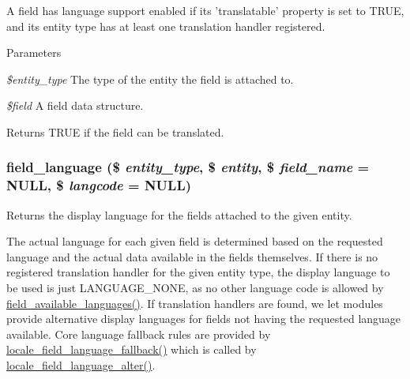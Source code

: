 A field has language support enabled if its 'translatable' property is set to TRUE, and its entity type has at least one translation handler registered.


\begin{DoxyParams}{Parameters}
\item[{\em \$entity\_\-type}]The type of the entity the field is attached to. \item[{\em \$field}]A field data structure.\end{DoxyParams}
\begin{DoxyReturn}{Returns}
TRUE if the field can be translated. 
\end{DoxyReturn}
\hypertarget{group__field__language_gaff79088cd3951d2127adad1a2c13ad3e}{
\subsubsection[{field\_\-language}]{\setlength{\rightskip}{0pt plus 5cm}field\_\-language (\$ {\em entity\_\-type}, \/  \$ {\em entity}, \/  \$ {\em field\_\-name} = {\ttfamily NULL}, \/  \$ {\em langcode} = {\ttfamily NULL})}}
\label{group__field__language_gaff79088cd3951d2127adad1a2c13ad3e}
Returns the display language for the fields attached to the given entity.

The actual language for each given field is determined based on the requested language and the actual data available in the fields themselves. If there is no registered translation handler for the given entity type, the display language to be used is just LANGUAGE\_\-NONE, as no other language code is allowed by \hyperlink{group__field__language_ga3dbd9611836d9bba15c15f0a8ae83c9b}{field\_\-available\_\-languages()}. If translation handlers are found, we let modules provide alternative display languages for fields not having the requested language available. Core language fallback rules are provided by \hyperlink{locale_8module_a434eb64757d6496331a45365258fbecc}{locale\_\-field\_\-language\_\-fallback()} which is called by \hyperlink{locale_8module_a2e2bf06bf347a63df595c58aad152428}{locale\_\-field\_\-language\_\-alter()}.


